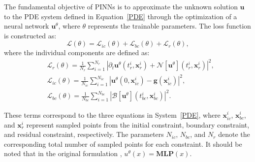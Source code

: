 The fundamental objective of PINNs is to approximate the unknown solution $\boldsymbol{u}$ to the PDE system defined in Equation~\ref{PDE} through the optimization of a neural network $\boldsymbol{u}^{\theta}$, where $\theta$ represents the trainable parameters. The loss function is constructed as:
\begin{equation}\label{PINN}
\mathcal{L}(\theta)=\mathcal{L}_{ic}(\theta)+\mathcal{L}_{bc}(\theta)+\mathcal{L}_r(\theta),
\end{equation}
where the individual components are defined as:
\begin{equation}
\begin{aligned}
& \mathcal{L}_r(\theta)=\frac{1}{N_r} \sum_{i=1}^{N_r}\left|\partial_{t}\boldsymbol{u}^\theta\left(t_r^i, \boldsymbol{x}_r^i\right)+\mathcal{N}\left[\boldsymbol{u}^\theta\right]\left(t_r^i, \boldsymbol{x}_r^i\right)\right|^2,\\
& \mathcal{L}_{ic}(\theta)=\frac{1}{N_{ic}} \sum_{i=1}^{N_{ic}}\left|\boldsymbol{u}^\theta\left(0, \boldsymbol{x}_{ic}^i\right)-\boldsymbol{g}\left(\boldsymbol{x}_{ic}^i\right)\right|^2, \\
& \mathcal{L}_{bc}(\theta)=\frac{1}{N_{bc}} \sum_{i=1}^{N_{bc}}\left|\mathcal{B}\left[\boldsymbol{u}^\theta\right]\left(t_{bc}^i, \boldsymbol{x}_{bc}^i\right)\right|^2.
\end{aligned}
\end{equation}

These terms correspond to the three equations in System~\ref{PDE}, where $\boldsymbol{x}_{ic}^i$, $\boldsymbol{x}_{bc}^i$, and $\boldsymbol{x}_{r}^i$ represent sampled points from the initial constraint, boundary constraint, and residual constraint, respectively. The parameters $N_{ic}$, $N_{bc}$, and $N_r$ denote the corresponding total number of sampled points for each constraint. It should be noted that in the original formulation \citep{raissi2019physics}, $u^\theta\left(x\right)=\mathbf{MLP}\left(x\right)$.


